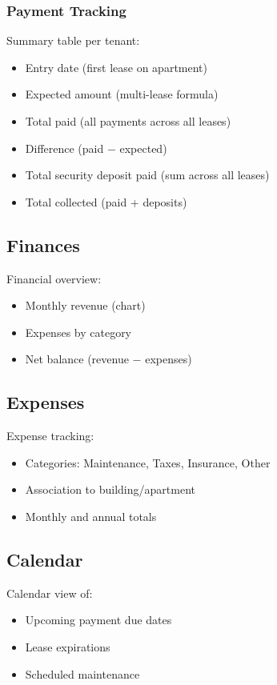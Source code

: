 \documentclass[a4paper,11pt]{article}
\begin{document}
\subsubsection{Payment Tracking}
Summary table per tenant:
\begin{itemize}
  \item Entry date (first lease on apartment)
  \item Expected amount (multi-lease formula)
  \item Total paid (all payments across all leases)
  \item Difference (paid $-$ expected)
  \item Total security deposit paid (sum across all leases)
  \item Total collected (paid + deposits)
\end{itemize}

\subsection{Finances}

Financial overview:
\begin{itemize}
  \item Monthly revenue (chart)
  \item Expenses by category
  \item Net balance (revenue $-$ expenses)
\end{itemize}

\subsection{Expenses}

Expense tracking:
\begin{itemize}
  \item Categories: Maintenance, Taxes, Insurance, Other
  \item Association to building/apartment
  \item Monthly and annual totals
\end{itemize}

\subsection{Calendar}

Calendar view of:
\begin{itemize}
  \item Upcoming payment due dates
  \item Lease expirations
  \item Scheduled maintenance
\end{itemize}
\end{document}
